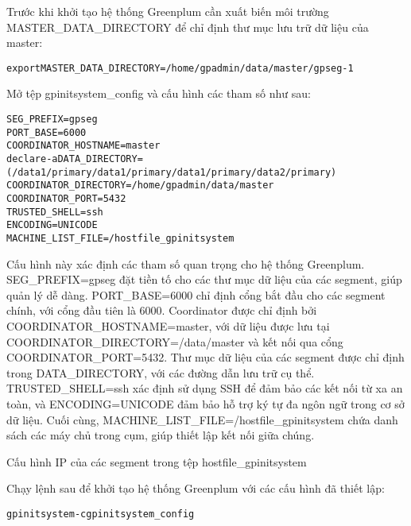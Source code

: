Trước khi khởi tạo hệ thống Greenplum cần xuất biến môi trường MASTER\_DATA\_DIRECTORY để chỉ định thư mục lưu trữ dữ liệu của master:

\begin{mdframed}[backgroundcolor=white, linecolor=black, roundcorner=5pt]
\begin{alltt}
export MASTER_DATA_DIRECTORY=/home/gpadmin/data/master/gpseg-1
\end{alltt}
\end{mdframed}


Mở tệp gpinitsystem\_config và cấu hình các tham số như sau:

\begin{mdframed}[backgroundcolor=white, linecolor=black, roundcorner=5pt]
\begin{alltt}
SEG_PREFIX=gpseg
PORT_BASE=6000
COORDINATOR_HOSTNAME=master
declare -a DATA_DIRECTORY=(/data1/primary /data1/primary /data1/primary/data2/primary)
COORDINATOR_DIRECTORY=/home/gpadmin/data/master
COORDINATOR_PORT=5432
TRUSTED_SHELL=ssh
ENCODING=UNICODE
MACHINE_LIST_FILE=/hostfile_gpinitsystem
\end{alltt}
\end{mdframed}


Cấu hình này xác định các tham số quan trọng cho hệ thống Greenplum. SEG\_PREFIX=gpseg đặt tiền tố cho các thư mục dữ liệu của các segment, giúp quản lý dễ dàng. PORT\_BASE=6000 chỉ định cổng bắt đầu cho các segment chính, với cổng đầu tiên là 6000. Coordinator được chỉ định bởi COORDINATOR\_HOSTNAME=master, với dữ liệu được lưu tại COORDINATOR\_DIRECTORY=/data/master và kết nối qua cổng COORDINATOR\_PORT=5432. Thư mục dữ liệu của các segment được chỉ định trong DATA\_DIRECTORY, với các đường dẫn lưu trữ cụ thể. TRUSTED\_SHELL=ssh xác định sử dụng SSH để đảm bảo các kết nối từ xa an toàn, và ENCODING=UNICODE đảm bảo hỗ trợ ký tự đa ngôn ngữ trong cơ sở dữ liệu. Cuối cùng, MACHINE\_LIST\_FILE=/hostfile\_gpinitsystem chứa danh sách các máy chủ trong cụm, giúp thiết lập kết nối giữa chúng.

Cấu hình IP của các segment trong tệp hostfile\_gpinitsystem

Chạy lệnh sau để khởi tạo hệ thống Greenplum với các cấu hình đã thiết lập:

\begin{mdframed}[backgroundcolor=white, linecolor=black, roundcorner=5pt]
\begin{alltt}
gpinitsystem -c gpinitsystem_config
\end{alltt}
\end{mdframed}

